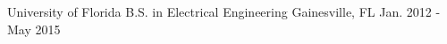 

\begin{cventries}

  \cventry
    {University of Florida} %
    {B.S. in Electrical Engineering} %
    {Gainesville, FL} %
    {Jan. 2012 - May 2015} %
		{}

\end{cventries}
